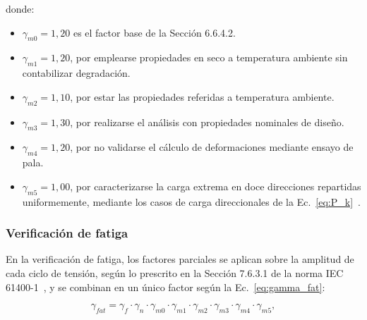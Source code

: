 donde:
\begin{itemize}
    \item $\gamma_{m0} = 1{,}20$ es el factor base de la Sección 6.6.4.2.
    \item $\gamma_{m1} = 1{,}20$, por emplearse propiedades en seco a temperatura ambiente sin contabilizar degradación.
    \item $\gamma_{m2} = 1{,}10$, por estar las propiedades referidas a temperatura ambiente.
    \item $\gamma_{m3} = 1{,}30$, por realizarse el análisis con propiedades nominales de diseño.
    \item $\gamma_{m4} = 1{,}20$, por no validarse el cálculo de deformaciones mediante ensayo de pala.
    \item $\gamma_{m5} = 1{,}00$, por caracterizarse la carga extrema en doce direcciones repartidas uniformemente, mediante los casos de carga direccionales de la Ec.~\ref{eq:P_k}~\parencite{IEC61400-5}.
\end{itemize}

\subsubsection{Verificación de fatiga}

En la verificación de fatiga, los factores parciales se aplican sobre la amplitud de cada ciclo de tensión, según lo prescrito en la Sección 7.6.3.1 de la norma IEC 61400-1~\parencite*{IEC61400-1}, y se combinan en un único factor según la Ec.~\ref{eq:gamma_fat}:

\begin{equation}
    \gamma_{fat} = \gamma_f \cdot \gamma_n \cdot \gamma_{m0} \cdot \gamma_{m1} \cdot \gamma_{m2} \cdot \gamma_{m3} \cdot \gamma_{m4} \cdot \gamma_{m5},
    \label{eq:gamma_fat}
\end{equation}

